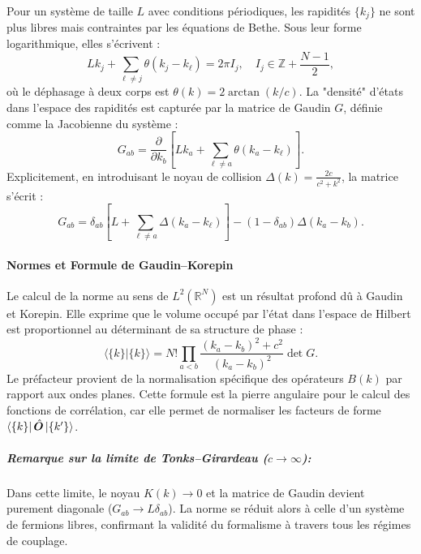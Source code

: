 Pour un système de taille $L$ avec conditions périodiques, les rapidités $\{k_j\}$ ne sont plus libres mais contraintes par les équations de Bethe. Sous leur forme logarithmique, elles s'écrivent :
\begin{equation}
    L k_j + \sum_{\ell \neq j} \theta(k_j - k_\ell) = 2\pi I_j, \quad I_j \in \mathbb{Z} + \frac{N-1}{2},
\end{equation}
où le déphasage à deux corps est $\theta(k) = 2 \arctan(k/c)$. La "densité" d'états dans l'espace des rapidités est capturée par la matrice de Gaudin $G$, définie comme la Jacobienne du système :
\begin{equation}
    G_{ab} = \frac{\partial}{\partial k_b} \left[ L k_a + \sum_{\ell \neq a} \theta(k_a - k_\ell) \right].
\end{equation}
Explicitement, en introduisant le noyau de collision $\Delta(k) = \frac{2c}{c^2+k^2}$, la matrice s'écrit :
\begin{equation}
    G_{ab} = \delta_{ab} \left[ L + \sum_{\ell \neq a} \Delta(k_a - k_\ell) \right] - (1-\delta_{ab}) \Delta(k_a - k_b).
\end{equation}

\paragraph{Normes et Formule de Gaudin--Korepin}

Le calcul de la norme au sens de $L^2(\mathbb{R}^N)$ est un résultat profond dû à Gaudin et Korepin. Elle exprime que le volume occupé par l'état dans l'espace de Hilbert est proportionnel au déterminant de sa structure de phase :
\begin{equation}
        \langle \{k\} | \{k\} \rangle = N! \prod_{a<b} \frac{(k_a - k_b)^2 + c^2}{(k_a - k_b)^2} \det G .
\end{equation}
Le préfacteur provient de la normalisation spécifique des opérateurs $B(k)$ par rapport aux ondes planes. Cette formule est la pierre angulaire pour le calcul des fonctions de corrélation, car elle permet de normaliser les facteurs de forme $\bra{\{k\}} \hat{\bm{O}} \ket{\{k'\}}$.



\subparagraph{Remarque sur la limite de Tonks--Girardeau ($c \to \infty$):} Dans cette limite, le noyau $K(k) \to 0$ et la matrice de Gaudin devient purement diagonale ($G_{ab} \to L \delta_{ab}$). La norme se réduit alors à celle d'un système de fermions libres, confirmant la validité du formalisme à travers tous les régimes de couplage.\\

